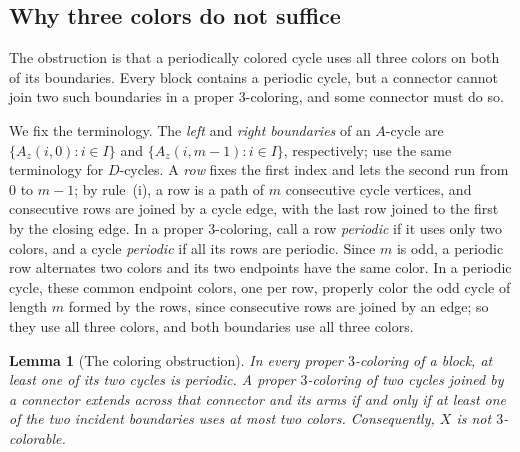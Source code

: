 \documentclass[11pt,letterpaper]{article}
\numberwithin{equation}{section}
\theoremstyle{plain}
\newtheorem{lemma}[theorem]{Lemma}
\theoremstyle{definition}
\theoremstyle{remark}
\begin{document}
\subsection{Why three colors do not suffice}\label{sec:obstruction}

The obstruction is that a periodically colored cycle uses all three colors on both of its boundaries. Every block contains a periodic cycle, but a connector cannot join two such boundaries in a proper $3$-coloring, and some connector must do so.

We fix the terminology. The \emph{left} and \emph{right boundaries} of an $A$-cycle are $\{A_z(i,0): i\in I\}$ and $\{A_z(i,m-1): i\in I\}$, respectively; use the same terminology for $D$-cycles. A \emph{row} fixes the first index and lets the second run from $0$ to $m-1$; by rule~(i), a row is a path of $m$ consecutive cycle vertices, and consecutive rows are joined by a cycle edge, with the last row joined to the first by the closing edge. In a proper $3$-coloring, call a row \emph{periodic} if it uses only two colors, and a cycle \emph{periodic} if all its rows are periodic. Since $m$ is odd, a periodic row alternates two colors and its two endpoints have the same color. In a periodic cycle, these common endpoint colors, one per row, properly color the odd cycle of length $m$ formed by the rows, since consecutive rows are joined by an edge; so they use all three colors, and both boundaries use all three colors.

\begin{lemma}[The coloring obstruction]\label{lem:obstruction}
In every proper $3$-coloring of a block, at least one of its two cycles is periodic. A proper $3$-coloring of two cycles joined by a connector extends across that connector and its arms if and only if at least one of the two incident boundaries uses at most two colors. Consequently, $X$ is not $3$-colorable.
\end{lemma}
\end{document}
